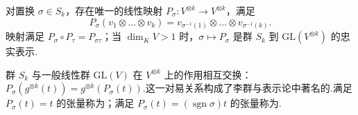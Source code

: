 \begin{theorem}[对称群在张量幂上的作用]\label{thm:sym-group-action}
对置换 $\sigma \in S_k$，存在唯一的线性映射 $P_\sigma \colon V^{\otimes k} \to V^{\otimes k}$，满足
\[
  P_\sigma(v_1 \otimes \dots \otimes v_k) = v_{\sigma^{-1}(1)} \otimes \dots \otimes v_{\sigma^{-1}(k)}.
\]
映射满足 $P_\sigma \circ P_\tau = P_{\sigma\tau}$；当 $\dim_K V > 1$ 时，$\sigma \mapsto P_\sigma$ 是群 $S_k$ 到 $\mathrm{GL}(V^{\otimes k})$ 的忠实表示.
\end{theorem}

群 $S_k$ 与一般线性群 $\mathrm{GL}(V)$ 在 $V^{\otimes k}$ 上的作用相互交换：$P_\sigma(g^{\otimes k}(t)) = g^{\otimes k}(P_\sigma(t))$.这一对易关系构成了李群与表示论中著名的.满足 $P_\sigma(t) = t$ 的张量称为；满足 $P_\sigma(t) = (\operatorname{sgn}\sigma)t$ 的张量称为.

